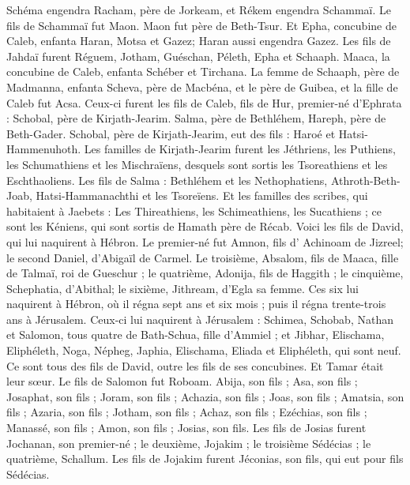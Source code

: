 \begin{multicols}{2}
Schéma engendra Racham, père de Jorkeam, et Rékem engendra Schammaï.
Le fils de Schammaï fut Maon. Maon fut père de Beth-Tsur.
Et Epha, concubine de Caleb, enfanta Haran, Motsa et Gazez; Haran aussi engendra Gazez.
Les fils de Jahdaï furent Réguem, Jotham, Guéschan, Péleth, Epha et Schaaph.
Maaca, la concubine de Caleb, enfanta Schéber et Tirchana.
La femme de Schaaph, père de Madmanna, enfanta Scheva, père de Macbéna, et le père de Guibea, et la fille de Caleb fut Acsa.
Ceux-ci furent les fils de Caleb, fils de Hur, premier-né d'Ephrata : Schobal, père de Kirjath-Jearim.
Salma, père de Bethléhem, Hareph, père de Beth-Gader.
Schobal, père de Kirjath-Jearim, eut des fils : Haroé et Hatsi-Hammenuhoth.
Les familles de Kirjath-Jearim furent les Jéthriens, les Puthiens, les Schumathiens et les Mischraïens, desquels sont sortis les Tsoreathiens et les Eschthaoliens.
Les fils de Salma : Bethléhem et les Nethophatiens, Athroth-Beth-Joab, Hatsi-Hammanachthi et les Tsoreïens.
Et les familles des scribes, qui habitaient à Jaebets : Les Thireathiens, les Schimeathiens, les Sucathiens ; ce sont les Kéniens, qui sont sortis de Hamath père de Récab.
\VerseOne{}Voici les fils de David, qui lui naquirent à Hébron. Le premier-né fut Amnon, fils d' Achinoam de Jizreel; le second Daniel, d'Abigaïl de Carmel.
Le troisième, Absalom, fils de Maaca, fille de Talmaï, roi de Gueschur ; le quatrième, Adonija, fils de Haggith ;
le cinquième, Schephatia, d'Abithal; le sixième, Jithream, d'Egla sa femme.
Ces six lui naquirent à Hébron, où il régna sept ans et six mois ; puis il régna trente-trois ans à Jérusalem.
Ceux-ci lui naquirent à Jérusalem : Schimea, Schobab, Nathan et Salomon, tous quatre de Bath-Schua, fille d'Ammiel ;
et Jibhar, Elischama, Eliphéleth,
Noga, Népheg, Japhia,
Elischama, Eliada et Eliphéleth, qui sont neuf.
Ce sont tous des fils de David, outre les fils de ses concubines. Et Tamar était leur sœur.
Le fils de Salomon fut  Roboam. Abija, son fils ; Asa, son fils ; Josaphat, son fils ;
Joram, son fils ; Achazia, son fils ; Joas, son fils ;
Amatsia, son fils ; Azaria, son fils ; Jotham, son fils ;
Achaz, son fils ; Ezéchias, son fils ; Manassé, son fils ;
Amon, son fils ; Josias, son fils.
Les fils de Josias furent Jochanan, son premier-né ; le deuxième, Jojakim ; le troisième Sédécias ; le quatrième, Schallum.
Les fils de Jojakim furent  Jéconias, son fils, qui eut pour fils Sédécias.

\end{multicols}
